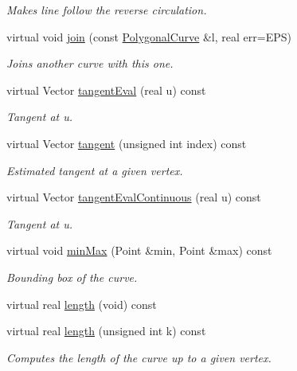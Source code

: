 \begin{DoxyCompactItemize}
\begin{DoxyCompactList}\small\item\em Makes line follow the reverse circulation. \end{DoxyCompactList}\item 
virtual void \hyperlink{classPolygonalCurve_a995b188b9a8d15051971ba3d531f955c}{join} (const \hyperlink{classPolygonalCurve}{PolygonalCurve} \&l, real err=EPS)
\begin{DoxyCompactList}\small\item\em Joins another curve with this one. \end{DoxyCompactList}\item 
virtual Vector \hyperlink{classPolygonalCurve_ad26e7fc7c76b2f41a0d52fd46596cf94}{tangentEval} (real u) const 
\begin{DoxyCompactList}\small\item\em Tangent at u. \end{DoxyCompactList}\item 
virtual Vector \hyperlink{classPolygonalCurve_acd2d10f2d1fc47b6e96dbf825a744b1c}{tangent} (unsigned int index) const 
\begin{DoxyCompactList}\small\item\em Estimated tangent at a given vertex. \end{DoxyCompactList}\item 
virtual Vector \hyperlink{classPolygonalCurve_aca3ac56dee09faba43e5f570587fcdac}{tangentEvalContinuous} (real u) const 
\begin{DoxyCompactList}\small\item\em Tangent at u. \end{DoxyCompactList}\item 
virtual void \hyperlink{classPolygonalCurve_a969ce749e035d55303f8e7490162120b}{minMax} (Point \&min, Point \&max) const 
\begin{DoxyCompactList}\small\item\em Bounding box of the curve. \end{DoxyCompactList}\item 
virtual real \hyperlink{classPolygonalCurve_a72d254e15fe90574be2e6ddce1da16d8}{length} (void) const 
\item 
virtual real \hyperlink{classPolygonalCurve_a9d6192cf3e924eae52383a24761becb5}{length} (unsigned int k) const 
\begin{DoxyCompactList}\small\item\em Computes the length of the curve up to a given vertex. \end{DoxyCompactList}\item 

\end{DoxyCompactItemize}
